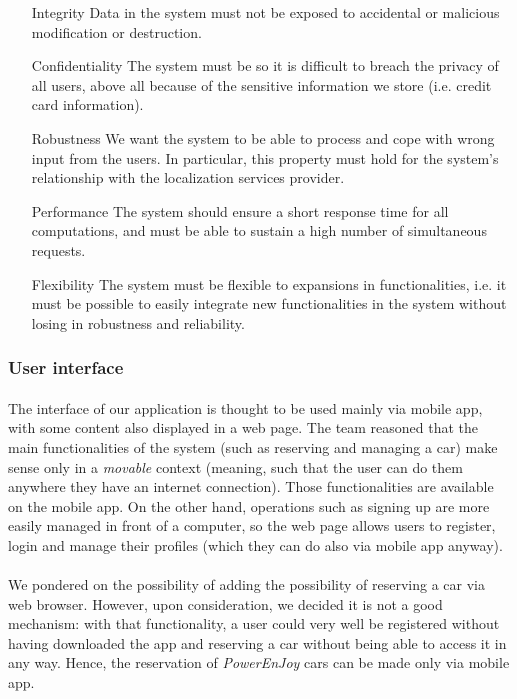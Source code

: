 	\begin{enumerate}
		\item[Integrity] Data in the system must not be exposed to accidental or malicious modification or destruction.
		\item[Confidentiality] The system must be so it is difficult to breach the privacy of all users, above all because of the sensitive information we store (i.e. credit card information).
		\item[Robustness] We want the system to be able to process and cope with wrong input from the users. In particular, this property must hold for the system's relationship with the localization services provider. 
		\item[Performance] The system should ensure a short response time for all computations, and must be able to sustain a high number of simultaneous requests.
		\item[Flexibility] The system must be flexible to expansions in functionalities, i.e. it must be possible to easily integrate new functionalities in the system without losing in robustness and reliability.
		
		
	\end{enumerate}

	\subsubsection{User interface}
	\paragraph{}The interface of our application is thought to be used mainly via mobile app, with some content also displayed in a web page. The team reasoned that the main functionalities of the system (such as reserving and managing a car) make sense only in a \textit{movable} context (meaning, such that the user can do them anywhere they have an internet connection). Those functionalities are available on the mobile app. On the other hand, operations such as signing up are more easily managed in front of a computer, so the web page allows users to register, login and manage their profiles (which they can do also via mobile app anyway).
	\paragraph{}We pondered on the possibility of adding the possibility of reserving a car via web browser. However, upon consideration, we decided it is not a good mechanism: with that functionality, a user could very well be registered without having downloaded the app and reserving a car without being able to access it in any way. Hence, the reservation of \textit{PowerEnJoy} cars can be made only via mobile app. 
	
